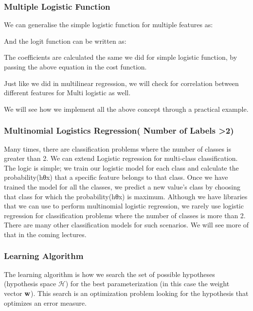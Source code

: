 \documentclass[11pt]{article}
\begin{document}
    \subsubsection{Multiple Logistic
Function}\label{multiple-logistic-function}

We can generalise the simple logistic function for multiple features as:

And the logit function can be written as:

The coefficients are calculated the same we did for simple logistic
function, by passing the above equation in the cost function.

Just like we did in multilinear regression, we will check for
correlation between different features for Multi logistic as well.

We will see how we implement all the above concept through a practical
example.

    \subsubsection{Multinomial Logistics Regression( Number of Labels
\textgreater{}2)}\label{multinomial-logistics-regression-number-of-labels-2}

Many times, there are classification problems where the number of
classes is greater than 2. We can extend Logistic regression for
multi-class classification. The logic is simple; we train our logistic
model for each class and calculate the probability(hθx) that a specific
feature belongs to that class. Once we have trained the model for all
the classes, we predict a new value's class by choosing that class for
which the probability(hθx) is maximum. Although we have libraries that
we can use to perform multinomial logistic regression, we rarely use
logistic regression for classification problems where the number of
classes is more than 2. There are many other classification models for
such scenarios. We will see more of that in the coming lectures.

    \subsubsection{Learning Algorithm}\label{learning-algorithm}

The learning algorithm is how we search the set of possible hypotheses
(hypothesis space \(\mathcal{H}\)) for the best parameterization (in
this case the weight vector \({\bf w}\)). This search is an optimization
problem looking for the hypothesis that optimizes an error measure.
\end{document}

